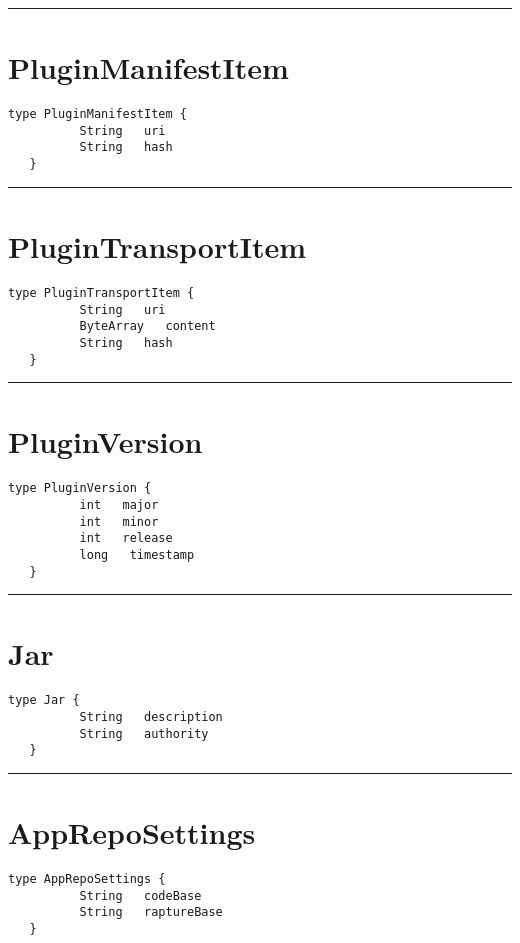 \rule{12cm}{2pt}
\section{PluginManifestItem}
\label{type:PluginManifestItem}

\begin{lstlisting}[style=nonumbers]
   type PluginManifestItem {
          String   uri
          String   hash
   }
\end{lstlisting}

\rule{12cm}{2pt}
\section{PluginTransportItem}
\label{type:PluginTransportItem}

\begin{lstlisting}[style=nonumbers]
   type PluginTransportItem {
          String   uri
          ByteArray   content
          String   hash
   }
\end{lstlisting}

\rule{12cm}{2pt}
\section{PluginVersion}
\label{type:PluginVersion}

\begin{lstlisting}[style=nonumbers]
   type PluginVersion {
          int   major
          int   minor
          int   release
          long   timestamp
   }
\end{lstlisting}

\rule{12cm}{2pt}
\section{Jar}
\label{type:Jar}

\begin{lstlisting}[style=nonumbers]
   type Jar {
          String   description
          String   authority
   }
\end{lstlisting}

\rule{12cm}{2pt}
\section{AppRepoSettings}
\label{type:AppRepoSettings}

\begin{lstlisting}[style=nonumbers]
   type AppRepoSettings {
          String   codeBase
          String   raptureBase
   }
\end{lstlisting}

